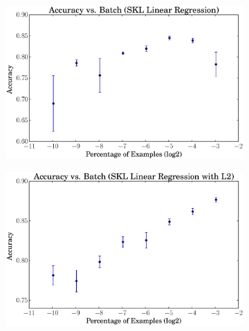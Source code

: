 \documentclass[a4paper, 12pt]{article}
\begin{document}
\begin{figure}[htpb]
    \centering
    \begin{subfigure}[htpb]{0.45\textwidth}
        \includegraphics[width=\textwidth]{acc_vs_batchp_skl_linreg}
        \caption{}
        \label{fig:batch_skl_linreg}
    \end{subfigure}
    \begin{subfigure}[htpb]{0.45\textwidth}
        \includegraphics[width=\textwidth]{acc_vs_batchp_skl_linregL2}
        \caption{}
        \label{fig:batch_skl_linregL2}
    \end{subfigure}
    \hfill %
    \begin{subfigure}[htpb]{0.45\textwidth}

\end{subfigure}
\end{figure}
\end{document}

